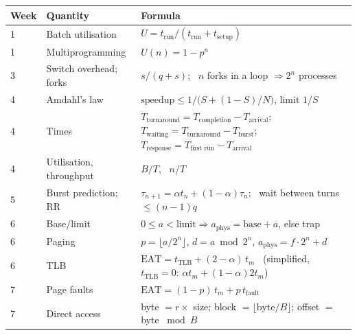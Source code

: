 \documentclass[11pt,a4paper]{article}
\begin{document}
\begin{center}
\small
\renewcommand{\arraystretch}{1.25}
\begin{tabularx}{\linewidth}{@{}l>{\raggedright\arraybackslash}p{3.1cm}>{\raggedright\arraybackslash}X@{}}
\toprule
\textbf{Week} & \textbf{Quantity} & \textbf{Formula} \\
\midrule
1 & Batch utilisation & $U = t_{\text{run}}/(t_{\text{run}} + t_{\text{setup}})$ \\
1 & Multiprogramming & $U(n) = 1 - p^{n}$ \\
3 & Switch overhead; forks & $s/(q+s)$; \ $n$ forks in a loop $\Rightarrow 2^{n}$ processes \\
4 & Amdahl's law & $\text{speedup} \le 1/\bigl(S + (1-S)/N\bigr)$, limit $1/S$ \\
4 & Times & $T_{\text{turnaround}} = T_{\text{completion}} - T_{\text{arrival}}$; $T_{\text{waiting}} = T_{\text{turnaround}} - T_{\text{burst}}$; $T_{\text{response}} = T_{\text{first run}} - T_{\text{arrival}}$ \\
4 & Utilisation, throughput & $B/T$, \ $n/T$ \\
5 & Burst prediction; RR & $\tau_{n+1} = \alpha t_n + (1-\alpha)\tau_n$; \ wait between turns $\le (n-1)q$ \\
6 & Base/limit & $0 \le a < \text{limit} \Rightarrow a_{\text{phys}} = \text{base} + a$, else trap \\
6 & Paging & $p = \lfloor a/2^{n}\rfloor$, $d = a \bmod 2^{n}$, $a_{\text{phys}} = f\cdot 2^{n} + d$ \\
6 & TLB & $\text{EAT} = t_{\text{TLB}} + (2-\alpha)\,t_m$ \ (simplified, $t_{\text{TLB}} = 0$: $\alpha t_m + (1-\alpha) 2t_m$) \\
7 & Page faults & $\text{EAT} = (1-p)\,t_m + p\,t_{\text{fault}}$ \\
7 & Direct access & byte $= r \times$ size; block $= \lfloor \text{byte}/B \rfloor$; offset $=$ byte $\bmod B$ \\
\bottomrule
\end{tabularx}


\end{center}
\end{document}

